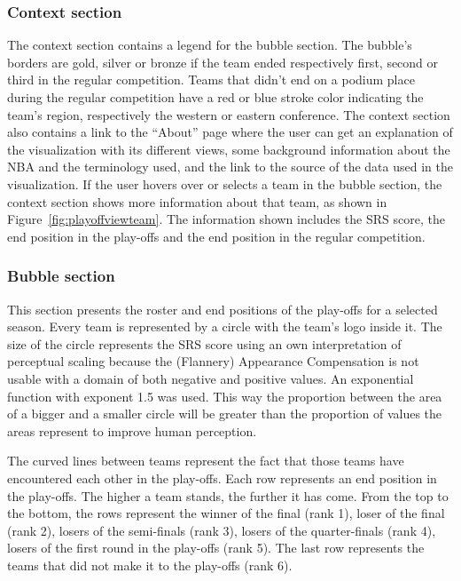\documentclass[]{sigchi}
\begin{document}
\subsubsection{Context section}
The context section contains a legend for the bubble section. The bubble's
borders are gold, silver or bronze if the team ended respectively first, second
or third in the regular competition. Teams that didn't end on a podium place
during the regular competition have a red or blue stroke color indicating the
team's region, respectively the western or eastern conference. The context
section also contains a link to the ``About'' page where the user can get an explanation of the visualization with its different views, some background information about the NBA and the terminology used, and the link to the source of the data used in the visualization. If the user hovers over or selects a team in the bubble section, the context section shows more information about that team, as shown in Figure~\ref{fig:playoffviewteam}. The information shown includes the SRS score, the end position in the play-offs and the end position in the regular competition.


\subsubsection{Bubble section}
This section presents the roster and end positions of the play-offs for a
selected season. Every team is represented by a circle with the team's logo inside it. The size of the circle represents the SRS score using an own
interpretation of perceptual scaling because the (Flannery) Appearance
Compensation is not usable with a domain of both negative and positive values.
An exponential function with exponent 1.5 was used. This way the proportion
between the area of a bigger and a smaller circle will be greater
than the proportion of values the areas represent to improve human perception.

The curved lines between teams represent the fact that those teams have 
encountered each other in the play-offs. Each row represents an end position 
in the play-offs. The higher a team stands, the further it has come.  From the 
top to the bottom, the rows represent the winner of the final (rank 1), loser 
of the final (rank 2), losers of the semi-finals (rank 3), losers of the 
quarter-finals (rank 4), losers of the first round in the play-offs (rank 5). The last row represents the teams that did not make it to the play-offs (rank 6). 
\end{document}
